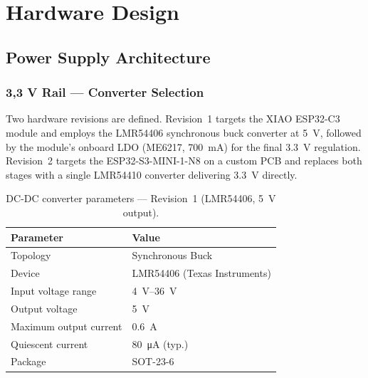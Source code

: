 \section{Hardware Design}
\label{sec:hardware_design}

\subsection{Power Supply Architecture}
\label{sec:power_supply}

\subsubsection{3,3 V Rail — Converter Selection}
\label{sec:3v3_converter}

Two hardware revisions are defined.
Revision~1 targets the XIAO ESP32-C3 module and employs the LMR54406 synchronous buck converter at \SI{5}{\volt}, followed by the module's onboard \ac{LDO} (ME6217, \SI{700}{\milli\ampere}) for the final \SI{3.3}{\volt} regulation.
Revision~2 targets the ESP32-S3-MINI-1-N8 on a custom \ac{PCB} and replaces both stages with a single LMR54410 converter delivering \SI{3.3}{\volt} directly.

\begin{table}[H]
  \caption{DC-DC converter parameters — Revision~1 (LMR54406, \SI{5}{\volt} output).}
  \label{tab:converter_rev1}
  \centering
  \begin{tabularx}{\textwidth}{|X|X|}
    \hline
    \textbf{Parameter} & \textbf{Value} \\ \hline \hline
    Topology            & Synchronous Buck \\ \hline
    Device              & LMR54406 (Texas Instruments) \\ \hline
    Input voltage range & \SI{4}{\volt}--\SI{36}{\volt} \\ \hline
    Output voltage      & \SI{5}{\volt} \\ \hline
    Maximum output current & \SI{0.6}{\ampere} \\ \hline
    Quiescent current   & \SI{80}{\micro\ampere} (typ.) \\ \hline
    Package             & SOT-23-6 \\ \hline
  \end{tabularx}
\end{table}

